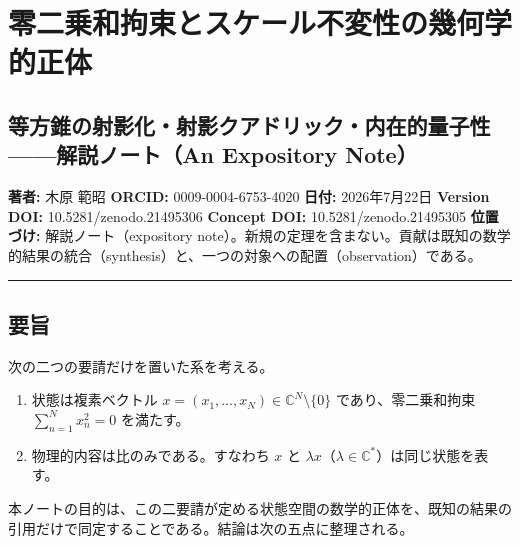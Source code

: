 \documentclass[
  a4paper,
]{ltjsarticle}
\author{}
\date{}
\providecommand{\tightlist}{%
  \setlength{\itemsep}{0pt}\setlength{\parskip}{0pt}}
\begin{document}
\section{零二乗和拘束とスケール不変性の幾何学的正体}\label{ux96f6ux4e8cux4e57ux548cux62d8ux675fux3068ux30b9ux30b1ux30fcux30ebux4e0dux5909ux6027ux306eux5e7eux4f55ux5b66ux7684ux6b63ux4f53}

\subsection{等方錐の射影化・射影クアドリック・内在的量子性------解説ノート（An
Expository
Note）}\label{ux7b49ux65b9ux9310ux306eux5c04ux5f71ux5316ux5c04ux5f71ux30afux30a2ux30c9ux30eaux30c3ux30afux5185ux5728ux7684ux91cfux5b50ux6027ux89e3ux8aacux30ceux30fcux30c8an-expository-note}

\textbf{著者:} 木原 範昭 \textbf{ORCID:} 0009-0004-6753-4020
\textbf{日付:} 2026年7月22日 \textbf{Version DOI:}
10.5281/zenodo.21495306 \textbf{Concept DOI:} 10.5281/zenodo.21495305
\textbf{位置づけ:} 解説ノート（expository
note）。新規の定理を含まない。貢献は既知の数学的結果の統合（synthesis）と、一つの対象への配置（observation）である。

\begin{center}\rule{0.5\linewidth}{0.5pt}\end{center}

\subsection{要旨}\label{ux8981ux65e8}

次の二つの要請だけを置いた系を考える。

\begin{enumerate}
\def\labelenumi{\arabic{enumi}.}
\tightlist
\item
  状態は複素ベクトル \(x=(x_1,\dots,x_N)\in\mathbb C^N\setminus\{0\}\)
  であり、零二乗和拘束 \(\sum_{n=1}^N x_n^2=0\) を満たす。
\item
  物理的内容は比のみである。すなわち \(x\) と
  \(\lambda x\)（\(\lambda\in\mathbb C^\ast\)）は同じ状態を表す。
\end{enumerate}

本ノートの目的は、この二要請が定める状態空間の数学的正体を、既知の結果の引用だけで同定することである。結論は次の五点に整理される。
\end{document}
